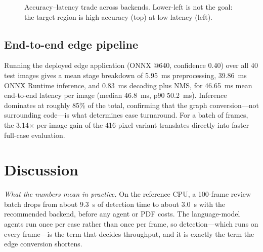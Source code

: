 \documentclass[conference]{IEEEtran}
\begin{document}
\begin{figure}[t]
\centering
{}
\caption{Accuracy--latency trade across backends. Lower-left is not the goal:
the target region is high accuracy (top) at low latency (left).}
\label{fig:trade}
\end{figure}

\subsection{End-to-end edge pipeline}

Running the deployed edge application (ONNX @640, confidence 0.40) over all
40 test images gives a mean stage breakdown of 5.95~ms preprocessing,
39.86~ms ONNX Runtime inference, and 0.83~ms decoding plus NMS, for
46.65~ms mean end-to-end latency per image (median 46.8~ms, p90 50.2~ms).
Inference dominates at roughly 85\% of the total, confirming that the graph
conversion---not surrounding code---is what determines case turnaround. For a
batch of frames, the 3.14$\times$ per-image gain of the 416-pixel variant
translates directly into faster full-case evaluation.

\section{Discussion}
\label{sec:discuss}

\emph{What the numbers mean in practice.} On the reference CPU, a 100-frame
review batch drops from about 9.3~s of detection time to about 3.0~s with the
recommended backend, before any agent or PDF costs. The language-model agents
run once per case rather than once per frame, so detection---which runs on
every frame---is the term that decides throughput, and it is exactly the term
the edge conversion shortens.
\end{document}
